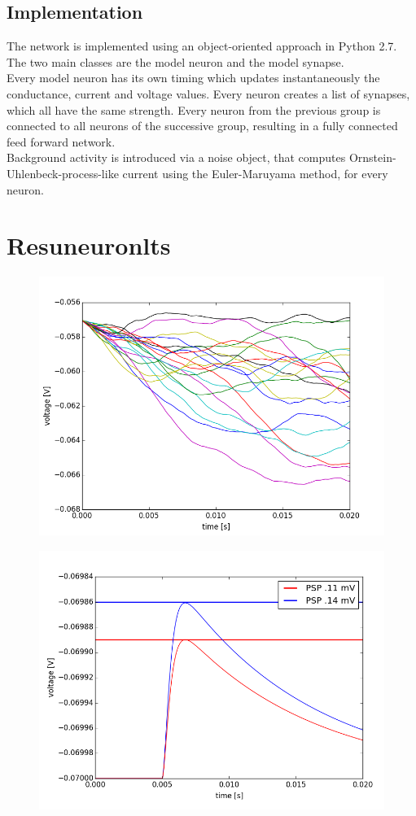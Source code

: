 \documentclass[12pt,a4paper, bibliography=totoc, listof=numbered, footexclude, BCOR=8.25mm, twoside]{scrartcl}
\begin{document}
  
  \subsection{Implementation}
  The network is implemented using an object-oriented approach in Python 2.7.
  The two main classes are the model neuron and the model synapse. \\
  Every model neuron has its own timing which updates instantaneously the conductance, current and voltage values. Every neuron creates a list of synapses, which all have the same strength. Every neuron from the previous group is connected to all neurons of the successive group, resulting in a fully connected feed forward network. \\
  Background activity is introduced via a noise object, that computes Ornstein-Uhlenbeck-process-like current using the Euler-Maruyama method, for every neuron.
  
  

  
  \section{Resuneuronlts}
  
  
  \begin{figure}
  \centering
  \includegraphics[width=0.7\linewidth]{./Plots/Our_Plots/noise}
  \caption{}
  \label{fig:noise}
  \end{figure}
  
  \begin{figure}
  \centering
  \includegraphics[width=0.7\linewidth]{./Plots/Our_Plots/PSP}
  \caption{}
  \label{fig:PSP}
  \end{figure}
  
\end{document}
